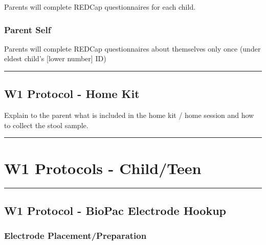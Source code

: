 \documentclass[]{book}
\begin{document}
Parents will complete REDCap questionnaires for each child.

\hypertarget{parent-self-1}{%
\subsubsection{Parent Self}\label{parent-self-1}}

Parents will complete REDCap questionnaires about themselves only once (under eldest child's {[}lower number{]} ID)

\begin{center}\rule{0.5\linewidth}{0.5pt}\end{center}

\hypertarget{w1-protocol---home-kit}{%
\subsection{W1 Protocol - Home Kit}\label{w1-protocol---home-kit}}

Explain to the parent what is included in the home kit / home session and how to collect the stool sample.

\begin{center}\rule{0.5\linewidth}{0.5pt}\end{center}

\hypertarget{w1-protocols---childteen}{%
\section{W1 Protocols - Child/Teen}\label{w1-protocols---childteen}}

\begin{center}\rule{0.5\linewidth}{0.5pt}\end{center}

\hypertarget{w1-protocol---biopac-electrode-hookup}{%
\subsection{W1 Protocol - BioPac Electrode Hookup}\label{w1-protocol---biopac-electrode-hookup}}

\hypertarget{electrode-placementpreparation}{%
\subsubsection{Electrode Placement/Preparation}\label{electrode-placementpreparation}}
\end{document}
